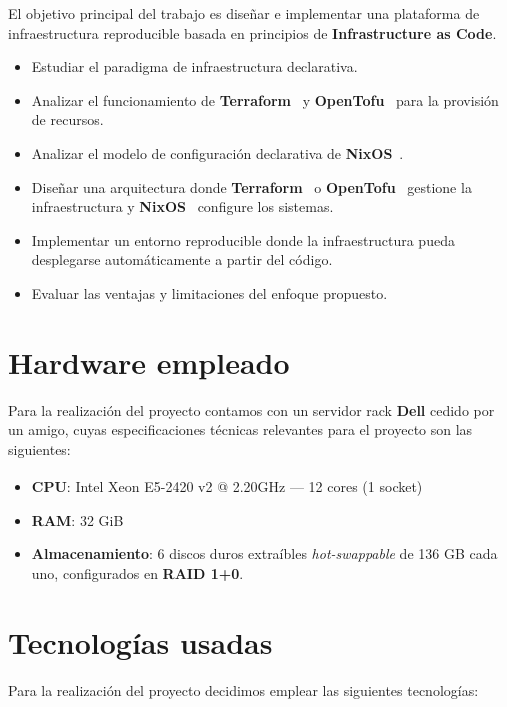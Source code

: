 \documentclass[a4paper, 11pt]{article}
\begin{document}
El objetivo principal del trabajo es diseñar e implementar una plataforma de 
infraestructura reproducible basada en principios de \textbf{Infrastructure as Code}.

\begin{itemize} 
  \item Estudiar el paradigma de infraestructura declarativa.
  \item Analizar el funcionamiento de \textbf{Terraform}~\cite{terraform} y \textbf{OpenTofu}~\cite{opentofu} para la provisión de recursos.
  \item Analizar el modelo de configuración declarativa de \textbf{NixOS}~\cite{nixos}.
  \item Diseñar una arquitectura donde \textbf{Terraform}~\cite{terraform} o \textbf{OpenTofu}~\cite{opentofu} gestione
    la infraestructura y \textbf{NixOS}~\cite{nixos} configure los sistemas.
  \item Implementar un entorno reproducible donde la infraestructura pueda desplegarse 
    automáticamente a partir del código.
  \item Evaluar las ventajas y limitaciones del enfoque propuesto.
\end{itemize} 

\section{Hardware empleado}

Para la realización del proyecto contamos con un servidor rack \textbf{Dell} cedido 
por un amigo, cuyas especificaciones técnicas relevantes para el proyecto son las siguientes:

\begin{itemize}
    \item \textbf{CPU}: Intel\textsuperscript{\textregistered} Xeon\textsuperscript{\textregistered} E5-2420 v2 @ 2.20GHz --- 12 cores (1 socket)
    \item \textbf{RAM}: 32 GiB
    \item \textbf{Almacenamiento}: 6 discos duros extraíbles \textit{hot-swappable} de 136 GB cada uno, configurados en \textbf{RAID 1+0}.
\end{itemize}

\section{Tecnologías usadas}

Para la realización del proyecto decidimos emplear las siguientes tecnologías:
\end{document}
